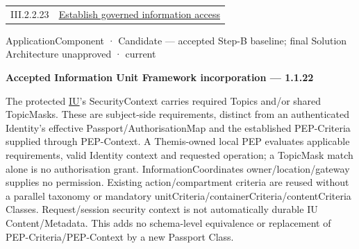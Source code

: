 \begin{longtable}{p{.22\linewidth}p{.73\linewidth}}
III.2.2.23 & \hyperref[element:26719186d6444b5b80029fbf13ae7d06]{Establish governed information access} \\
\end{longtable}
\label{element:899d34ec491948b68aad09e507dea6d1}
{\small ApplicationComponent · Candidate — accepted Step-B baseline; final Solution Architecture unapproved · current}\par

\par\medskip\textbf{Accepted Information Unit Framework incorporation — 1.1.22}\par


The protected \hyperref[element:74ec609de1ae498fbf9d13e4ef8c6cbe]{IU}'s SecurityContext carries required Topics and/or shared TopicMasks. These are subject-side requirements, distinct from an authenticated Identity's effective Passport/AuthorisationMap and the established PEP-Criteria supplied through PEP-Context. A Themis-owned local PEP evaluates applicable requirements, valid Identity context and requested operation; a TopicMask match alone is no authorisation grant. InformationCoordinates owner/location/gateway supplies no permission. Existing action/compartment criteria are reused without a parallel taxonomy or mandatory unitCriteria/containerCriteria/contentCriteria Classes. Request/session security context is not automatically durable IU Content/Metadata. This adds no schema-level equivalence or replacement of PEP-Criteria/PEP-Context by a new Passport Class.



